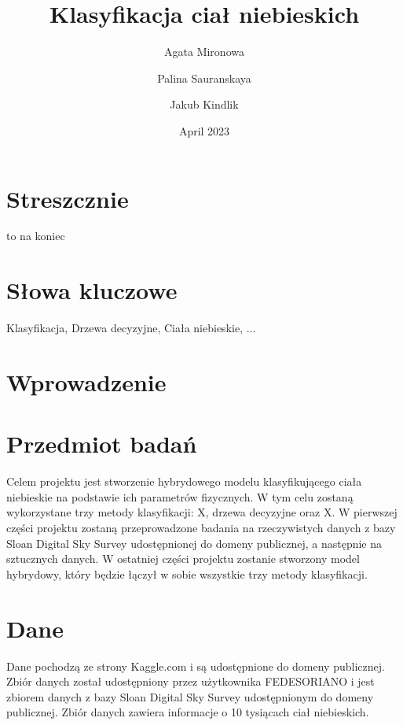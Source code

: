\documentclass{article}
\title{Klasyfikacja ciał niebieskich}
\author{Agata Mironowa\and Palina Sauranskaya \and Jakub Kindlik }
\date{April 2023}
\begin{document}
\maketitle
\tableofcontents

\section{Streszcznie}
to na koniec
\section{Słowa kluczowe}
Klasyfikacja, Drzewa decyzyjne, Ciała niebieskie, ...
\section{Wprowadzenie}
\section{Przedmiot badań}
Celem projektu jest stworzenie hybrydowego modelu klasyfikującego ciała niebieskie na podstawie ich parametrów fizycznych.
W tym celu zostaną wykorzystane trzy metody klasyfikacji: X, drzewa decyzyjne oraz X.
W pierwszej części projektu zostaną przeprowadzone badania na rzeczywistych danych z bazy Sloan Digital Sky Survey
udostępnionej do domeny publicznej, a następnie na sztucznych danych.
W ostatniej części projektu zostanie stworzony model hybrydowy, który będzie łączył w sobie wszystkie trzy metody klasyfikacji.
\section{Dane}
Dane pochodzą ze strony Kaggle.com i są udostępnione do domeny publicznej. Zbiór danych został udostępniony przez
użytkownika FEDESORIANO i jest zbiorem danych z bazy Sloan Digital Sky Survey udostępnionym do domeny publicznej.
Zbiór danych zawiera informacje o 10 tysiącach ciał niebieskich.
\end{document}
